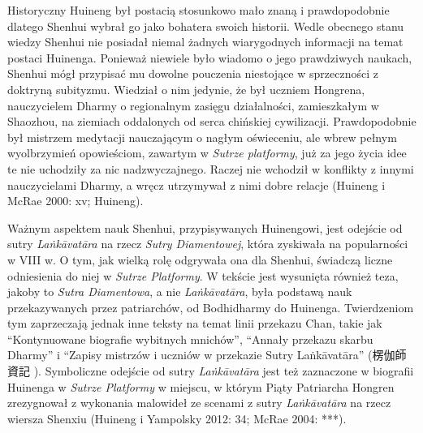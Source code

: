 Historyczny Huineng był postacią stosunkowo mało znaną i prawdopodobnie dlatego Shenhui wybrał go jako bohatera swoich historii.
Wedle obecnego stanu wiedzy Shenhui nie posiadał niemal żadnych wiarygodnych informacji na temat postaci Huinenga.
Ponieważ niewiele było wiadomo o jego prawdziwych naukach, Shenhui mógł przypisać mu dowolne pouczenia niestojące w sprzeczności z doktryną subityzmu.
Wiedział o nim jedynie, że był uczniem Hongrena, nauczycielem Dharmy o regionalnym zasięgu działalności, zamieszkałym w Shaozhou, na ziemiach oddalonych od serca chińskiej cywilizacji.
Prawdopodobnie był mistrzem medytacji nauczającym o nagłym oświeceniu, ale wbrew pełnym wyolbrzymień opowieściom, zawartym w \textit{Sutrze platformy}, już za jego życia idee te nie uchodziły za nic nadzwyczajnego.
Raczej nie wchodził w konflikty z innymi nauczycielami Dharmy, a wręcz utrzymywał z nimi dobre relacje
(Huineng i McRae 2000: xv; Huineng).

Ważnym aspektem nauk Shenhui, przypisywanych Huinengowi, jest odejście od sutry \textit{La\.nkā\-vatāra} na rzecz \textit{Sutry Diamentowej}, która zyskiwała na popularności w VIII w.
O tym, jak wielką rolę odgrywała ona dla Shenhui, świadczą liczne odniesienia do niej w \textit{Sutrze Platformy}.
W tekście jest wysunięta również teza, jakoby to \textit{Sutra Diamentowa}, a nie \textit{La\.nkāvatāra}, była podstawą nauk przekazywanych przez patriarchów, od Bodhidharmy do Huinenga.
Twierdzeniom tym zaprzeczają jednak inne teksty na temat linii przekazu Chan, takie jak ``Kontynuowane biografie wybitnych mnichów'', ``Annały przekazu skarbu Dharmy'' i ``Zapisy mistrzów i uczniów w przekazie Sutry La\.nkāvatāra'' (楞伽師資記 ).
Symboliczne odejście od sutry \textit{La\.nkāvatāra} jest też zaznaczone w biografii Huinenga w \textit{Sutrze Platformy} w miejscu, w którym Piąty Patriarcha Hongren zrezygnował z wykonania malowideł ze scenami z sutry \textit{La\.nkāvatāra} na rzecz wiersza Shenxiu (Huineng i Yampolsky 2012: 34; McRae 2004: ***).

